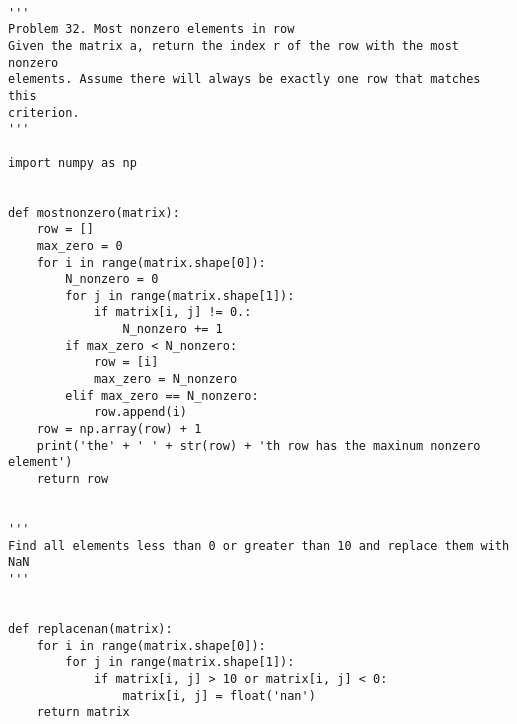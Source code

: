 \documentclass{article}
\begin{document}
\begin{verbatim}

'''
Problem 32. Most nonzero elements in row
Given the matrix a, return the index r of the row with the most nonzero
elements. Assume there will always be exactly one row that matches this
criterion.
'''

import numpy as np


def mostnonzero(matrix):
    row = []
    max_zero = 0
    for i in range(matrix.shape[0]):
        N_nonzero = 0
        for j in range(matrix.shape[1]):
            if matrix[i, j] != 0.:
                N_nonzero += 1
        if max_zero < N_nonzero:
            row = [i]
            max_zero = N_nonzero
        elif max_zero == N_nonzero:
            row.append(i)
    row = np.array(row) + 1
    print('the' + ' ' + str(row) + 'th row has the maxinum nonzero element')
    return row


'''
Find all elements less than 0 or greater than 10 and replace them with NaN
'''


def replacenan(matrix):
    for i in range(matrix.shape[0]):
        for j in range(matrix.shape[1]):
            if matrix[i, j] > 10 or matrix[i, j] < 0:
                matrix[i, j] = float('nan')
    return matrix
\end{verbatim} 
\end{document}
